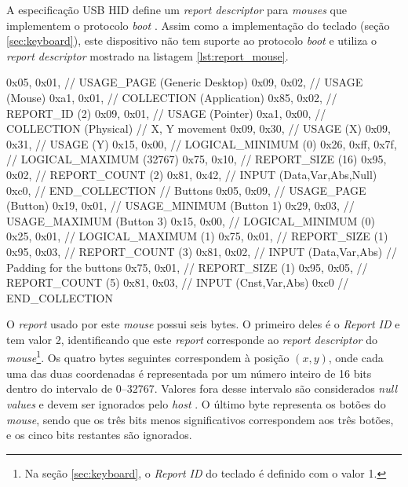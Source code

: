 \documentclass[brazil,pagestart=firstchapter]{abnt}
\begin{document}
A especificação \ac{USB} \ac{HID} define um \textit{report descriptor} para
\textit{mouses} que implementem o protocolo \textit{boot}
\cite{usbhid}. Assim como a implementação do teclado (seção
\ref{sec:keyboard}), este dispositivo não tem suporte ao protocolo
\textit{boot} e utiliza o \textit{report descriptor} mostrado na listagem
\ref{lst:report_mouse}.

\begin{ccode}[numbers=none, float=h, label={lst:report_mouse},
	caption={\textit{Report descriptor} do \textit{mouse} USB}
]
	0x05, 0x01,        // USAGE_PAGE (Generic Desktop)
	0x09, 0x02,        // USAGE (Mouse)
	0xa1, 0x01,        // COLLECTION (Application)
	0x85, 0x02,	       //   REPORT_ID (2)
	0x09, 0x01,        //   USAGE (Pointer)
	0xa1, 0x00,        //   COLLECTION (Physical)
	// X, Y movement
	0x09, 0x30,        //     USAGE (X)
	0x09, 0x31,        //     USAGE (Y)
	0x15, 0x00,        //     LOGICAL_MINIMUM (0)
	0x26, 0xff, 0x7f,  //     LOGICAL_MAXIMUM (32767)
	0x75, 0x10,        //     REPORT_SIZE (16)
	0x95, 0x02,        //     REPORT_COUNT (2)
	0x81, 0x42,        //     INPUT (Data,Var,Abs,Null)
	0xc0,              //   END_COLLECTION
	// Buttons
	0x05, 0x09,        //   USAGE_PAGE (Button)
	0x19, 0x01,        //   USAGE_MINIMUM (Button 1)
	0x29, 0x03,        //   USAGE_MAXIMUM (Button 3)
	0x15, 0x00,        //   LOGICAL_MINIMUM (0)
	0x25, 0x01,        //   LOGICAL_MAXIMUM (1)
	0x75, 0x01,        //   REPORT_SIZE (1)
	0x95, 0x03,        //   REPORT_COUNT (3)
	0x81, 0x02,        //   INPUT (Data,Var,Abs)
	// Padding for the buttons
	0x75, 0x01,        //   REPORT_SIZE (1)
	0x95, 0x05,        //   REPORT_COUNT (5)
	0x81, 0x03,        //   INPUT (Cnst,Var,Abs)
	0xc0               // END_COLLECTION
\end{ccode}

O \textit{report} usado por este \textit{mouse} possui seis bytes. O
primeiro deles é o \textit{Report ID} e tem valor 2, identificando que este
\textit{report} corresponde ao \textit{report descriptor} do
\textit{mouse}\footnote{
	Na seção \ref{sec:keyboard}, o \textit{Report ID} do teclado é definido
	com o valor 1.
}. Os quatro bytes seguintes correspondem à posição $(x, y)$, onde cada uma
das duas coordenadas é representada por um número inteiro de 16 bits dentro
do intervalo de \numrange{0}{32767}. Valores fora desse intervalo são
considerados \textit{null values} e devem ser ignorados pelo \textit{host}
\cite{usbhid}. O último byte representa os botões do \textit{mouse},
sendo que os três bits menos significativos correspondem aos três botões, e
os cinco bits restantes são ignorados.
\end{document}
